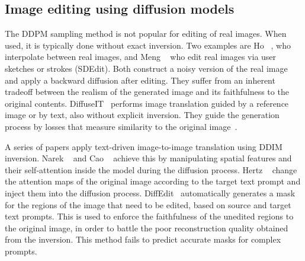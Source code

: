 

\subsection{Image editing using diffusion models}
The DDPM sampling method is not popular for editing of real images. When used, it is typically done without exact inversion. %
Two examples are Ho \etal~\cite{Ho20}, who interpolate between real images, and Meng \etal~\cite{Meng22} who edit real images via user sketches or strokes (SDEdit). Both construct a noisy version of the real image and apply a backward diffusion after editing. They suffer from an inherent tradeoff between the realism of the generated image and its faithfulness to the original contents. %
DiffuseIT~\cite{Gihyun22} performs image translation guided by a reference image or by text, also without explicit inversion. They guide the generation process by losses that measure similarity to the original image~\cite{Prafulla21}.

A series of papers apply text-driven image-to-image translation using DDIM inversion. Narek \etal~\cite{Narek22} and Cao \etal~\cite{cao23} achieve this by manipulating spatial features and their self-attention inside the model during the diffusion process. Hertz \etal~\cite{Hertz22} change the attention maps of the original image according to the target text prompt and inject them into the diffusion process. DiffEdit~\cite{Guillaume22} automatically generates a mask for the regions of the image that need to be edited, based on source and target text prompts. This is used to enforce the faithfulness of the unedited regions to the original image, in order to battle the poor reconstruction quality obtained from the inversion. This method fails to predict accurate masks for complex prompts.%

